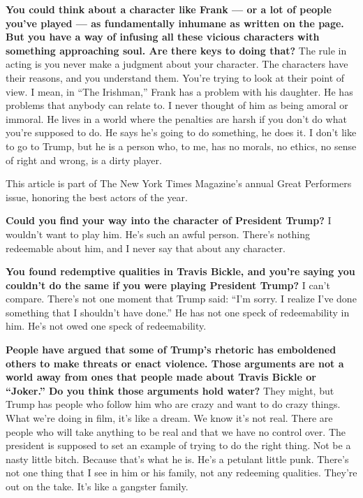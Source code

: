 \textbf{You could think about a character like Frank --- or a lot of
people you've played --- as fundamentally inhumane as written on the
page. But you have a way of infusing all these vicious characters with
something approaching soul. Are there keys to doing that?} The rule in
acting is you never make a judgment about your character. The characters
have their reasons, and you understand them. You're trying to look at
their point of view. I mean, in ``The Irishman,'' Frank has a problem
with his daughter. He has problems that anybody can relate to. I never
thought of him as being amoral or immoral. He lives in a world where the
penalties are harsh if you don't do what you're supposed to do. He says
he's going to do something, he does it. I don't like to go to Trump, but
he is a person who, to me, has no morals, no ethics, no sense of right
and wrong, is a dirty player.

\href{https://www.nytimes3xbfgragh.onion/interactive/2019/12/09/magazine/best-actors.html}{}

This article is part of The New York Times Magazine's annual Great
Performers issue, honoring the best actors of the year.

\textbf{Could you find your way into the character of President Trump?}
I wouldn't want to play him. He's such an awful person. There's nothing
redeemable about him, and I never say that about any character.

\textbf{You found redemptive qualities in Travis Bickle, and you're
saying you couldn't do the same if you were playing President Trump?} I
can't compare. There's not one moment that Trump said: ``I'm sorry. I
realize I've done something that I shouldn't have done.'' He has not one
speck of redeemability in him. He's not owed one speck of redeemability.

\textbf{People have argued that some of Trump's rhetoric has emboldened
others to make threats or enact violence. Those arguments are not a
world away from ones that people made about Travis Bickle or ``Joker.''
Do you think those arguments hold water?} They might, but Trump has
people who follow him who are crazy and want to do crazy things. What
we're doing in film, it's like a dream. We know it's not real. There are
people who will take anything to be real and that we have no control
over. The president is supposed to set an example of trying to do the
right thing. Not be a nasty little bitch. Because that's what he is.
He's a petulant little punk. There's not one thing that I see in him or
his family, not any redeeming qualities. They're out on the take. It's
like a gangster family.

